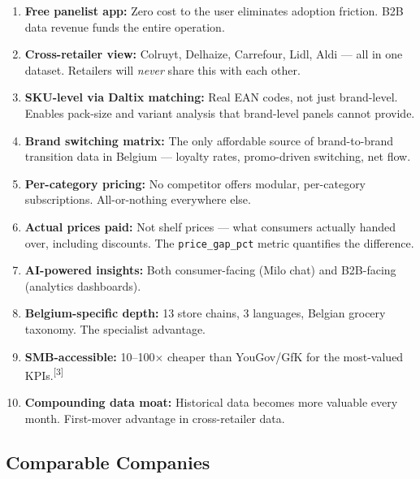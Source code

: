 \documentclass[11pt,a4paper]{article}
\begin{document}
\begin{enumerate}[leftmargin=1.5em, itemsep=3pt]
  \item \textbf{Free panelist app:} Zero cost to the user eliminates adoption friction. B2B data revenue funds the entire operation.
  \item \textbf{Cross-retailer view:} Colruyt, Delhaize, Carrefour, Lidl, Aldi --- all in one dataset. Retailers will \emph{never} share this with each other.
  \item \textbf{SKU-level via Daltix matching:} Real EAN codes, not just brand-level. Enables pack-size and variant analysis that brand-level panels cannot provide.
  \item \textbf{Brand switching matrix:} The only affordable source of brand-to-brand transition data in Belgium --- loyalty rates, promo-driven switching, net flow.
  \item \textbf{Per-category pricing:} No competitor offers modular, per-category subscriptions. All-or-nothing everywhere else.
  \item \textbf{Actual prices paid:} Not shelf prices --- what consumers actually handed over, including discounts. The \texttt{price\_gap\_pct} metric quantifies the difference.
  \item \textbf{AI-powered insights:} Both consumer-facing (Milo chat) and B2B-facing (analytics dashboards).
  \item \textbf{Belgium-specific depth:} 13 store chains, 3 languages, Belgian grocery taxonomy. The specialist advantage.
  \item \textbf{SMB-accessible:} 10--100$\times$ cheaper than YouGov/GfK for the most-valued KPIs.\textsuperscript{[3]}
  \item \textbf{Compounding data moat:} Historical data becomes more valuable every month. First-mover advantage in cross-retailer data.
\end{enumerate}

\subsection{Comparable Companies}
\end{document}
